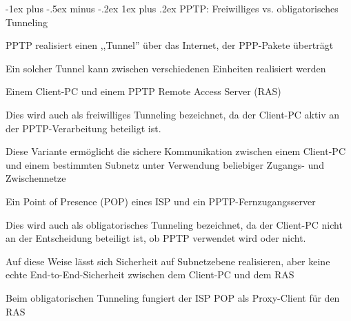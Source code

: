 \documentclass[a4paper]{article}
\makeatletter
\renewcommand{\subsubsection}{\@startsection{subsubsection}{3}{0mm}%
 {-1ex plus -.5ex minus -.2ex}%
 {1ex plus .2ex}%
 {\normalfont\small\bfseries}}
\makeatother
\begin{document}
\begin{multicols}{3}
      \subsubsection{PPTP: Freiwilliges vs. obligatorisches Tunneling}
      \begin{itemize*}
            \item PPTP realisiert einen ,,Tunnel'' über das Internet, der PPP-Pakete überträgt
            \item Ein solcher Tunnel kann zwischen verschiedenen Einheiten realisiert werden
            \item Einem Client-PC und einem PPTP Remote Access Server (RAS)
            \begin{itemize*}
                  \item Dies wird auch als freiwilliges Tunneling bezeichnet, da der Client-PC aktiv an der PPTP-Verarbeitung beteiligt ist.
                  \item Diese Variante ermöglicht die sichere Kommunikation zwischen einem Client-PC und einem bestimmten Subnetz unter Verwendung beliebiger Zugangs- und Zwischennetze
            \end{itemize*}
            \item Ein Point of Presence (POP) eines ISP und ein PPTP-Fernzugangsserver
            \begin{itemize*}
                  \item Dies wird auch als obligatorisches Tunneling bezeichnet, da der Client-PC nicht an der Entscheidung beteiligt ist, ob PPTP verwendet wird oder nicht.
                  \item Auf diese Weise lässt sich Sicherheit auf Subnetzebene realisieren, aber keine echte End-to-End-Sicherheit zwischen dem Client-PC und dem RAS
                  \item Beim obligatorischen Tunneling fungiert der ISP POP als Proxy-Client für den RAS
            \end{itemize*}
      \end{itemize*}



\end{multicols}
\end{document}
